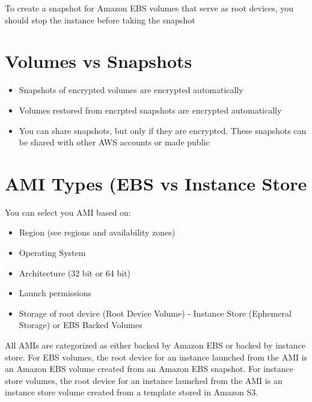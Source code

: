 \documentclass{article}
\begin{document}
To create a snapshot for Amazon EBS volumes that serve as root devices, you should stop the instance before taking the snapshot

\section{Volumes vs Snapshots}
\begin{itemize}
\item
Snapshots of encrypted volumes are encrypted automatically

\item
Volumes restored from encrpted snapshots are encrypted automatically

\item
You can share snapshots, but only if they are encrypted. These snapshots can be shared with other AWS accounts or made public

\end{itemize}

\section{AMI Types (EBS vs Instance Store}
You can select you AMI based on:
\begin{itemize}
\item
Region (see regions and availability zones)

\item
Operating System

\item
Architecture (32 bit or 64 bit)

\item
Launch permissions

\item
Storage of root device (Root Device Volume) - Instance Store (Ephemeral Storage) or EBS Backed Volumes
\end{itemize}

All AMIs are categorized as either backed by Amazon EBS or backed by instance store. For EBS volumes, the root device for an instance launched from the AMI is an Amazon EBS volume created from an Amazon EBS snapshot. For instance store volumes, the root device for an instance launched from the AMI is an instance store volume created from a template stored in Amazon S3.
\end{document}
